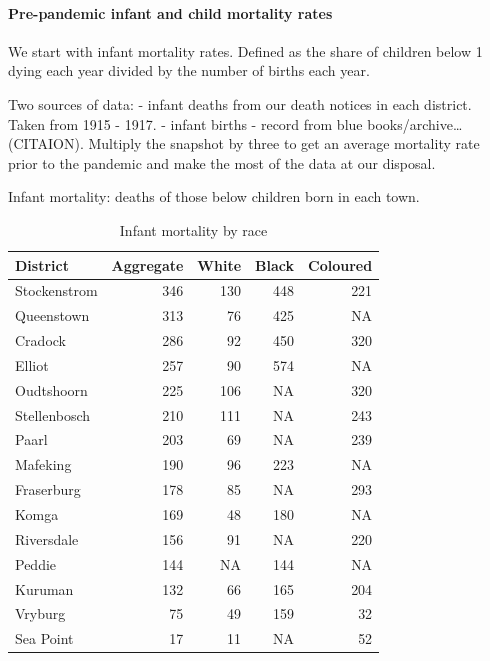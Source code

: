 \documentclass[fleqn,10pt,lineno]{wlpeerj} %
\begin{document}
\hypertarget{pre-pandemic-infant-and-child-mortality-rates}{%
\paragraph{Pre-pandemic infant and child mortality rates}\label{pre-pandemic-infant-and-child-mortality-rates}}

We start with infant mortality rates. Defined as the share of children below 1 dying each year divided by the number of births each year.

Two sources of data:
- infant deaths from our death notices in each district. Taken from 1915 - 1917.
- infant births - record from blue books/archive\ldots{} (CITAION). Multiply the snapshot by three to get an average mortality rate prior to the pandemic and make the most of the data at our disposal.

Infant mortality: deaths of those below children born in each town.

\begin{table}

\caption{\label{tab:unnamed-chunk-9}Infant mortality by race}
\centering
\begin{tabular}[t]{l|r|r|r|r}
\hline
District & Aggregate & White & Black & Coloured\\
\hline
Stockenstrom & 346 & 130 & 448 & 221\\
\hline
Queenstown & 313 & 76 & 425 & NA\\
\hline
Cradock & 286 & 92 & 450 & 320\\
\hline
Elliot & 257 & 90 & 574 & NA\\
\hline
Oudtshoorn & 225 & 106 & NA & 320\\
\hline
Stellenbosch & 210 & 111 & NA & 243\\
\hline
Paarl & 203 & 69 & NA & 239\\
\hline
Mafeking & 190 & 96 & 223 & NA\\
\hline
Fraserburg & 178 & 85 & NA & 293\\
\hline
Komga & 169 & 48 & 180 & NA\\
\hline
Riversdale & 156 & 91 & NA & 220\\
\hline
Peddie & 144 & NA & 144 & NA\\
\hline
Kuruman & 132 & 66 & 165 & 204\\
\hline
Vryburg & 75 & 49 & 159 & 32\\
\hline
Sea Point & 17 & 11 & NA & 52\\
\hline
\end{tabular}
\end{table}
\end{document}
